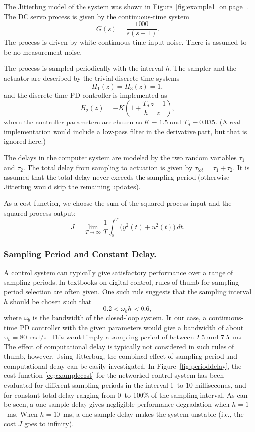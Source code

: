\documentclass[final,twoside]{rapport}  %
\begin{document}
The {\sc Jitterbug} model of the system was shown in
Figure~\ref{fig:example1} on page~\pageref{fig:example1}. The DC servo
process is given by the continuous-time system
\[
G(s) = \frac{1000}{s(s+1)}.
\]
The process is driven by white continuous-time input noise. There is
assumed to be no measurement noise.

The process is sampled periodically
with the interval $h$. The sampler and the actuator are described by
the trivial discrete-time systems
\[
H_1(z) = H_3(z) = 1,
\]
and the discrete-time PD controller is implemented as
\[
H_2(z) = -K \left(1+\frac{T_d}{h}\frac{z-1}{z}\right),
\]
where the controller parameters are chosen as $K=1.5$ and $T_d =
0.035$. (A real implementation would include a low-pass filter in
the derivative part, but that is ignored here.)

The delays in the computer system are modeled by the two random
variables $\tau_1$ and $\tau_2$. The total delay
from sampling to actuation is given by $\tau_{tot} = \tau_1 +
\tau_2$. It is assumed that the total delay never exceeds the sampling
period (otherwise {\sc Jitterbug} would skip the remaining updates).

As a cost function, we choose the sum of the squared
process input and the squared process output:
\begin{equation}
J = \lim_{T\rightarrow \infty} \frac{1}{T} \int_0^T \bigl ( y^2(t)
+ u^2(t) \bigr) \, dt.
\label{eq:examplecost}
\end{equation}

\subsubsection*{Sampling Period and Constant Delay.}

A control system can typically give satisfactory performance over a
range of sampling periods. In textbooks on digital control, rules of
thumb for sampling period selection are often given. One such rule
suggests that the sampling interval $h$ should be chosen such that
\[
0.2 < \omega_b h < 0.6,
\]
where $\omega_b$ is the bandwidth of the closed-loop system. In our
case, a continuous-time PD controller with the given parameters would
give a bandwidth of about $\omega_b = 80$~rad/s. This would imply a
sampling period of between 2.5 and 7.5~ms. The effect of
computational delay is typically not considered in such rules of
thumb, however. Using {\sc Jitterbug}, the combined effect of sampling
period and computational delay can be easily investigated. In
Figure~\ref{fig:perioddelay}, the cost function \eqref{eq:examplecost}
for the networked control system has been evaluated for different
sampling periods in the interval 1~to 10 milliseconds, and for
constant total delay ranging from 0~to 100\% of the sampling interval.
As can be seen, a one-sample delay gives negligible performance
degradation when $h=1$~ms. When $h=10$~ms, a one-sample delay makes
the system unstable (i.e., the cost $J$ goes to infinity).
\end{document}
